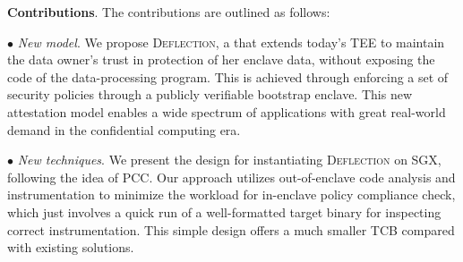 
\vspace{3pt}\noindent\textbf{Contributions}. The contributions are outlined as follows:

\vspace{3pt}\noindent$\bullet$\textit{ New model}. We propose \textsc{Deflection}, a  that extends today's TEE to maintain the data owner's trust in protection of her enclave data, without exposing the code of the data-processing program. This is achieved through enforcing a set of security policies through a publicly verifiable bootstrap enclave. This new attestation model enables a wide spectrum of applications with great real-world demand in the confidential computing era. 
    
\vspace{3pt}\noindent$\bullet$\textit{ New techniques}. We present the design for instantiating \textsc{Deflection} on SGX, following the idea of PCC. Our approach utilizes out-of-enclave code analysis and instrumentation to minimize the workload for in-enclave policy compliance check, which just involves a quick run of a well-formatted target binary for inspecting correct instrumentation. This simple design offers a much smaller TCB compared with existing solutions.   


